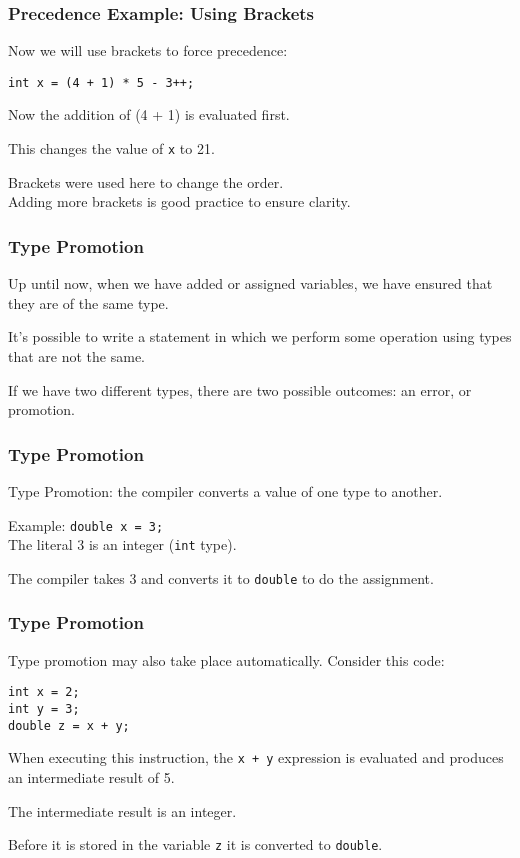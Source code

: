 \begin{frame}
\frametitle{Precedence Example: Using Brackets}

Now we will use brackets to force precedence:

\texttt{int x = (4 + 1) * 5 - 3++;}

Now the addition of (4 + 1) is evaluated first.

This changes the value of \texttt{x} to 21.

Brackets were used here to change the order.\\
Adding more brackets is good practice to ensure clarity.

\end{frame}

\begin{frame}
\frametitle{Type Promotion}

Up until now, when we have added or assigned variables, we have ensured that they are of the same type.

It's possible to write a statement in which we perform some operation using types that are not the same.

If we have two different types, there are two possible outcomes: an error, or \alert{promotion}.

\end{frame}


\begin{frame}
\frametitle{Type Promotion}
Type Promotion: the compiler converts a value of one type to another.

Example: \texttt{double x = 3; }\\
\quad The literal 3 is an integer (\texttt{int} type).

The compiler takes 3 and converts it to \texttt{double} to do the assignment.

\end{frame}

\begin{frame}[fragile]
\frametitle{Type Promotion}
Type promotion may also take place automatically. Consider this code:

\begin{verbatim}
int x = 2;
int y = 3;
double z = x + y;
\end{verbatim}

When executing this instruction, the \texttt{x + y} expression is evaluated and produces an intermediate result of 5.

The intermediate result is an integer.

Before it is stored in the variable \texttt{z} it is converted to \texttt{double}.

\end{frame}

